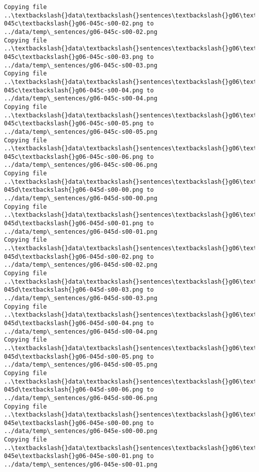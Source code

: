 \documentclass[11pt]{article}
\begin{document}
\begin{Verbatim}[commandchars=\\\{\}]
Copying file ..\textbackslash{}data\textbackslash{}sentences\textbackslash{}g06\textbackslash{}g06-045c\textbackslash{}g06-045c-s00-02.png to
../data/temp\_sentences/g06-045c-s00-02.png
Copying file ..\textbackslash{}data\textbackslash{}sentences\textbackslash{}g06\textbackslash{}g06-045c\textbackslash{}g06-045c-s00-03.png to
../data/temp\_sentences/g06-045c-s00-03.png
Copying file ..\textbackslash{}data\textbackslash{}sentences\textbackslash{}g06\textbackslash{}g06-045c\textbackslash{}g06-045c-s00-04.png to
../data/temp\_sentences/g06-045c-s00-04.png
Copying file ..\textbackslash{}data\textbackslash{}sentences\textbackslash{}g06\textbackslash{}g06-045c\textbackslash{}g06-045c-s00-05.png to
../data/temp\_sentences/g06-045c-s00-05.png
Copying file ..\textbackslash{}data\textbackslash{}sentences\textbackslash{}g06\textbackslash{}g06-045c\textbackslash{}g06-045c-s00-06.png to
../data/temp\_sentences/g06-045c-s00-06.png
Copying file ..\textbackslash{}data\textbackslash{}sentences\textbackslash{}g06\textbackslash{}g06-045d\textbackslash{}g06-045d-s00-00.png to
../data/temp\_sentences/g06-045d-s00-00.png
Copying file ..\textbackslash{}data\textbackslash{}sentences\textbackslash{}g06\textbackslash{}g06-045d\textbackslash{}g06-045d-s00-01.png to
../data/temp\_sentences/g06-045d-s00-01.png
Copying file ..\textbackslash{}data\textbackslash{}sentences\textbackslash{}g06\textbackslash{}g06-045d\textbackslash{}g06-045d-s00-02.png to
../data/temp\_sentences/g06-045d-s00-02.png
Copying file ..\textbackslash{}data\textbackslash{}sentences\textbackslash{}g06\textbackslash{}g06-045d\textbackslash{}g06-045d-s00-03.png to
../data/temp\_sentences/g06-045d-s00-03.png
Copying file ..\textbackslash{}data\textbackslash{}sentences\textbackslash{}g06\textbackslash{}g06-045d\textbackslash{}g06-045d-s00-04.png to
../data/temp\_sentences/g06-045d-s00-04.png
Copying file ..\textbackslash{}data\textbackslash{}sentences\textbackslash{}g06\textbackslash{}g06-045d\textbackslash{}g06-045d-s00-05.png to
../data/temp\_sentences/g06-045d-s00-05.png
Copying file ..\textbackslash{}data\textbackslash{}sentences\textbackslash{}g06\textbackslash{}g06-045d\textbackslash{}g06-045d-s00-06.png to
../data/temp\_sentences/g06-045d-s00-06.png
Copying file ..\textbackslash{}data\textbackslash{}sentences\textbackslash{}g06\textbackslash{}g06-045e\textbackslash{}g06-045e-s00-00.png to
../data/temp\_sentences/g06-045e-s00-00.png
Copying file ..\textbackslash{}data\textbackslash{}sentences\textbackslash{}g06\textbackslash{}g06-045e\textbackslash{}g06-045e-s00-01.png to
../data/temp\_sentences/g06-045e-s00-01.png

\end{Verbatim}
\end{document}
